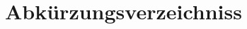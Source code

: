 \newpage
\thispagestyle{empty}
\section*{Abkürzungsverzeichniss}
\begin{acronym}[Bash]
   \end{acronym}